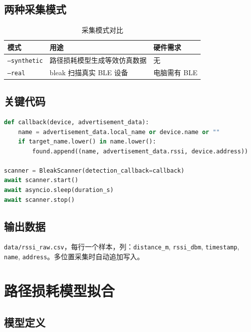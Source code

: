 \documentclass[11pt,a4paper]{article}
\newcommand{\code}[1]{\texttt{#1}}
\begin{document}
\subsection{两种采集模式}

\begin{table}[H]
\centering
\caption{采集模式对比}
\begin{tabular}{lll}
\toprule
\textbf{模式} & \textbf{用途} & \textbf{硬件需求} \\
\midrule
\code{--synthetic} & 路径损耗模型生成等效仿真数据 & 无 \\
\code{--real} & bleak 扫描真实 BLE 设备 & 电脑需有 BLE \\
\bottomrule
\end{tabular}
\end{table}

\subsection{关键代码}

\begin{lstlisting}[language=Python, caption={BLE 扫描回调函数}]
def callback(device, advertisement_data):
    name = advertisement_data.local_name or device.name or ""
    if target_name.lower() in name.lower():
        found.append((name, advertisement_data.rssi, device.address))

scanner = BleakScanner(detection_callback=callback)
await scanner.start()
await asyncio.sleep(duration_s)
await scanner.stop()
\end{lstlisting}

\subsection{输出数据}

\code{data/rssi\_raw.csv}，每行一个样本，列：\code{distance\_m}, \code{rssi\_dbm}, \code{timestamp}, \code{name}, \code{address}。多位置采集时自动追加写入。

\section{路径损耗模型拟合}

\subsection{模型定义}
\end{document}
